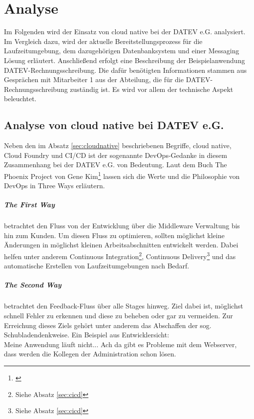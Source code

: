 \chapter{Analyse}\label{ch:analyse}
Im Folgenden wird der Einsatz von cloud native bei der DATEV e.G. analysiert.
Im Vergleich dazu, wird der aktuelle Bereitstellungsprozess für die Laufzeitumgebung, dem dazugehörigen Datenbanksystem und einer Messaging Lösung erläutert.
Anschließend erfolgt eine Beschreibung der Beispielanwendung \glqq DATEV-Rechnungsschreibung\grqq.
Die dafür benötigten Informationen stammen aus Gesprächen mit Mitarbeiter 1 aus der Abteilung, die für die DATEV-Rechnungsschreibung zuständig ist.
Es wird vor allem der technische Aspekt beleuchtet.

\section{Analyse von cloud native bei DATEV e.G.}\label{sec:analysecloud}
Neben den im Absatz \ref{sec:cloudnative} beschriebenen Begriffe, \glqq cloud native\grqq, \glqq Cloud Foundry\grqq{} und \glqq CI/CD\grqq{} ist der sogenannte \glqq DevOps\grqq-Gedanke in diesem Zusammenhang bei der DATEV e.G. von Bedeutung.
Laut dem Buch \glqq The Phoenix Project\grqq{} von Gene Kim\footnote{\cite[Kap. \glqq The Three Ways Explained\grqq]{Kim.2014}} lassen sich die Werte und die Philosophie von DevOps in \glqq Three Ways\grqq{} erläutern.

\paragraph{\glqq The First Way\grqq} betrachtet den Fluss von der Entwicklung über die Middleware Verwaltung bis hin zum Kunden.
Um diesen Fluss zu optimieren, sollten möglichst kleine Änderungen in möglichst kleinen Arbeitsabschnitten entwickelt werden.
Dabei helfen unter anderem Continuous Integration\footnote{Siehe Absatz \ref{sec:cicd}}, Continuous Delivery\footnote{Siehe Absatz \ref{sec:cicd}} und das automatische Erstellen von Laufzeitumgebungen nach Bedarf.

\paragraph{\glqq The Second Way\grqq} betrachtet den Feedback-Fluss über alle Stages hinweg.
Ziel dabei ist, möglichst schnell Fehler zu erkennen und diese zu beheben oder gar zu vermeiden.
Zur Erreichung dieses Ziels gehört unter anderem das Abschaffen der sog. \glqq Schubladendenkweise\grqq.
Ein Beispiel aus Entwicklersicht:\\
\glqq Meine Anwendung läuft nicht... Ach da gibt es Probleme mit dem Webserver, dass werden die Kollegen der Administration schon lösen\grqq.


